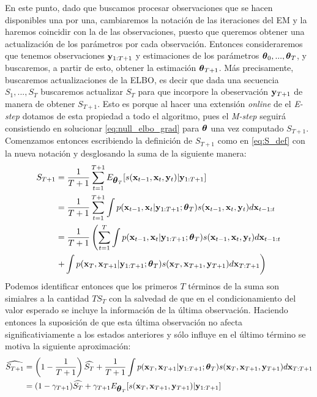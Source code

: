 En este punto, dado que buscamos procesar observaciones que se hacen disponibles una por una, cambiaremos la notación de las iteraciones del EM y la haremos coincidir con la de las observaciones, puesto que queremos obtener una actualización de los parámetros por cada observación. Entonces consideraremos que tenemos observaciones $\mathbf{y}_{1:T+1}$ y estimaciones de los parámetros $\mbox{\boldmath$ \theta $}_0, ..., \mbox{\boldmath$ \theta $}_T$, y buscaremos, a partir de esto, obtener la estimación $\mbox{\boldmath$ \theta $}_{T+1}$. Más precisamente, buscaremos actualizaciones de la ELBO, es decir que dada una secuencia $S_1, ..., S_T$ buscaremos actualizar $S_T$ para que incorpore la obeservación $\mathbf{y}_{T+1}$ de manera de obtener $S_{T+1}$. Esto es porque al hacer una extensión \textit{online} de el \textit{E-step} dotamos de esta propiedad a todo el algoritmo, pues el \textit{M-step} seguirá consistiendo en solucionar \ref{eq:null_elbo_grad} para $\mbox{\boldmath$ \theta $}$ una vez computado $S_{T+1}$. Comenzamos entonces escribiendo la definición de $S_{T+1}$ como en \ref{eq:S_def} con la nueva notación y desglosando la suma de la siguiente manera:
\begin{align}
    S_{T+1} &= \frac{1}{T+1}\sum_{t=1}^{T+1} E_{\mbox{\boldmath$ \theta $}_T} [s(\mathbf{x}_{t-1}, \mathbf{x}_t, \mathbf{y}_t) | \mathbf{y}_{1:T+1}] \\
    &= \frac{1}{T+1}\sum_{t=1}^{T+1} \int p(\mathbf{x}_{t-1}, \mathbf{x}_t | \mathbf{y}_{1:T+1}; \mbox{\boldmath$ \theta $}_T) s(\mathbf{x}_{t-1}, \mathbf{x}_t, \mathbf{y}_t) d\mathbf{x}_{t-1:t}\\
    &= \frac{1}{T+1} \left( \sum_{t=1}^{T} \int p(\mathbf{x}_{t-1}, \mathbf{x}_t | \mathbf{y}_{1:T+1}; \mbox{\boldmath$ \theta $}_T) s(\mathbf{x}_{t-1}, \mathbf{x}_t, \mathbf{y}_t)  d\mathbf{x}_{t-1:t} \right.\\ 
    &\left. + \int p(\mathbf{x}_{T}, \mathbf{x}_{T+1} | \mathbf{y}_{1:T+1}; \mbox{\boldmath$ \theta $}_T) s(\mathbf{x}_{T}, \mathbf{x}_{T+1}, \mathbf{y}_{T+1}) d\mathbf{x}_{T:T+1} \right)
\end{align}
Podemos identificar entonces que los primeros $T$ términos de la suma son simialres a la cantidad $TS_T$ con la salvedad de que en el condicionamiento del valor esperado se incluye la información de la última observación. Haciendo entonces la suposición de que esta última observación no afecta significativiamente a los estados anteriores y sólo influye en el último término se motiva la siguiente aproximación:
\begin{align}
    \widehat{S_{T+1}} &= \left(1 - \frac{1}{T+1}\right) \widehat{S_T} + \frac{1}{T+1} \int p(\mathbf{x}_{T}, \mathbf{x}_{T+1} | \mathbf{y}_{1:T+1}; \mbox{\boldmath$ \theta $}_T) s(\mathbf{x}_{T}, \mathbf{x}_{T+1}, \mathbf{y}_{T+1}) d\mathbf{x}_{T:T+1} \\
    &= (1 - \gamma_{T+1}) \widehat{S_T} + \gamma_{T+1} E_{\mbox{\boldmath$ \theta $}_T} [s(\mathbf{x}_T, \mathbf{x}_{T+1}, \mathbf{y}_{T+1}) | \mathbf{y}_{1:T+1}] \label{eq:onlineEM_S_rescursion}
\end{align}

